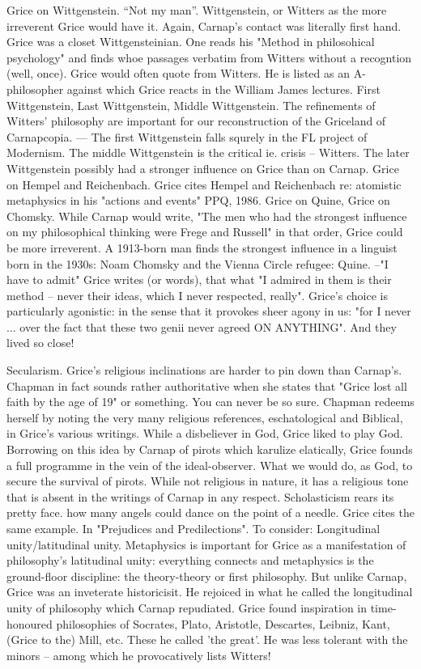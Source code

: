 \documentclass[10pt,titlepage]{book}
\begin{document}
Grice  on Wittgenstein. “Not my man”. Wittgenstein, or Witters as the more 
irreverent  Grice would have it. Again, Carnap's contact was literally 
first hand. Grice  was a closet Wittgensteinian. One reads his "Method in 
philosohical  psychology" and finds whoe passages verbatim from Witters without a 
recogntion  (well, once). Grice would often quote from Witters. He is listed 
as an  A-philosopher against which Grice reacts in the William James 
lectures. First  Wittgenstein, Last Wittgenstein, Middle Wittgenstein. The 
refinements of  Witters' philosophy are important for our reconstruction of the 
Griceland of  Carnapcopia. --- The first Wittgenstein falls squrely in the FL 
project of  Modernism. The middle Wittgenstein is the critical ie. crisis -- 
Witters. The  later Wittgenstein possibly had  a stronger influence on Grice 
than on  Carnap. 
Grice  on Hempel and Reichenbach. Grice cites Hempel and Reichenbach re: 
atomistic  metaphysics in his "actions and events" PPQ, 1986.  
Grice  on Quine, Grice on Chomsky. While  Carnap would write, "The men who 
had the strongest  influence on my  philosophical thinking were Frege and 
Russell" in that order,  Grice could  be more irreverent. A 1913-born man 
finds the strongest influence in  a  linguist born in the 1930s: Noam Chomsky 
and the Vienna Circle refugee:  Quine.  --"I have to admit" Grice writes (or 
words), that what "I admired  in them is  their method -- never their ideas, 
which I never respected,  really". Grice's choice is particularly agonistic: 
in the sense that it provokes  sheer agony in  us: "for I never ... over 
the fact that these two genii  never agreed ON  ANYTHING". And they lived so 
close!

Secularism.  Grice's religious inclinations are harder to pin down than 
Carnap’s. Chapman in  fact sounds rather authoritative when she states that 
"Grice lost all faith by  the age of 19" or something. You can never be so 
sure. Chapman redeems herself  by noting the very many religious references, 
eschatological and Biblical, in  Grice's various writings. While a disbeliever 
in God, Grice liked to play God.  Borrowing on this idea by Carnap of 
pirots which karulize elatically, Grice  founds a full programme in the vein of 
the ideal-observer. What we would do, as  God, to secure the survival of 
pirots. While not religious in nature, it has a  religious tone that is absent 
in the writings of Carnap in any  respect. 
Scholasticism  rears its pretty face. how many angels could dance on the 
point of a needle.  Grice cites the same example. In "Prejudices and 
Predilections". To consider:  Longitudinal unity/latitudinal unity. Metaphysics is 
important for Grice as a  manifestation of philosophy's latitudinal unity: 
everything connects and  metaphysics is the ground-floor discipline: the 
theory-theory or first  philosophy. But unlike Carnap, Grice was an inveterate 
historicisit. He rejoiced  in what he called the longitudinal unity of 
philosophy which Carnap repudiated.  Grice found inspiration in time-honoured 
philosophies of Socrates, Plato,  Aristotle, Descartes, Leibniz, Kant, (Grice to 
the) Mill, etc. These he called  'the great'. He was less tolerant with the 
minors -- among which he  provocatively lists Witters! 
 
\end{document}
